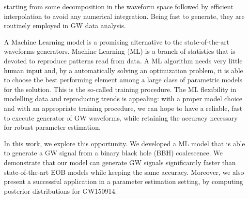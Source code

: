 starting from some decomposition in the waveform space followed by efficient interpolation to avoid any  numerical integration. Being fast to generate, they are routinely employed in GW data analysis. 
\par
A Machine Learning model is a promising alternative to the state-of-the-art waveforms generators. Machine Learning (ML) is a branch of statistics that is devoted to reproduce patterns read from data. A ML algorithm needs very little human input and, by a automatically solving an optimization problem, it is able to choose the best performing element among a large class of parametric models for the solution. This is the so-called training procedure. The ML flexibility in modelling data and reproducing trends is appealing: with a proper model choice and with an appropriate training procedure, we can hope to have a reliable, fast to execute generator of GW waveforms, while retaining the accuracy necessary for robust parameter estimation.
\par
\par
In this work, we explore this opportunity. We developed a ML model that is able to generate a GW signal from a binary black  hole (BBH) coalescence. We demonstrate that our model can generate GW signals significantly faster than state-of-the-art EOB models while keeping the same accuracy. Moreover, we also present a successful 
application in a parameter estimation setting, by computing posterior distributions for GW150914.

